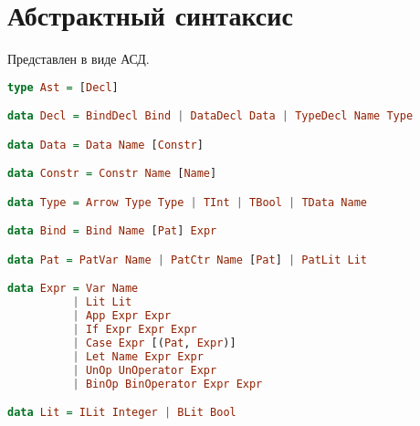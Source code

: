 \documentclass[12pt, a4paper] {ncc}
\begin{document}
\section{Абстрактный синтаксис}

Представлен в виде АСД.

\begin{lstlisting}[language=Haskell]
type Ast = [Decl]

data Decl = BindDecl Bind | DataDecl Data | TypeDecl Name Type

data Data = Data Name [Constr]

data Constr = Constr Name [Name]

data Type = Arrow Type Type | TInt | TBool | TData Name

data Bind = Bind Name [Pat] Expr

data Pat = PatVar Name | PatCtr Name [Pat] | PatLit Lit

data Expr = Var Name
          | Lit Lit
          | App Expr Expr
          | If Expr Expr Expr
          | Case Expr [(Pat, Expr)]
          | Let Name Expr Expr
          | UnOp UnOperator Expr
          | BinOp BinOperator Expr Expr

data Lit = ILit Integer | BLit Bool

\end{lstlisting}
\end{document}
